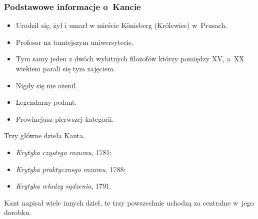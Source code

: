 \documentclass[10pt,t]{beamer}
\begin{document}
\begin{frame}
  \frametitle{Podstawowe informacje o~Kancie}



  \begin{itemize}
    \RaggedRight

  \item Urodził się, żył i umarł w mieście K\"{o}nisberg (Królewiec)
    w~Prusach.

  \item Profesor na tamtejszym uniwersytecie.

  \item Tym samy jeden z dwóch wybitnych filozofów którzy pomiędzy XV,
    a~XX wiekiem parali się tym zajęciem.

  \item Nigdy się nie ożenił.

  \item Legendarny pedant.

  \item Prowincjusz pierwszej kategorii.

  \end{itemize}

  Trzy główne dzieła Kanta.
  \begin{itemize}
    \RaggedRight

  \item \textit{Krytyka czystego rozumu}, 1781;

  \item \textit{Krytyka praktycznego rozumu}, 1788;

  \item \textit{Krytyka władzy sądzenia}, 1791.

  \end{itemize}
  Kant napisał wiele innych dzieł, te trzy powszechnie uchodzą za
  centralne w~jego dorobku.

\end{frame}
\end{document}
